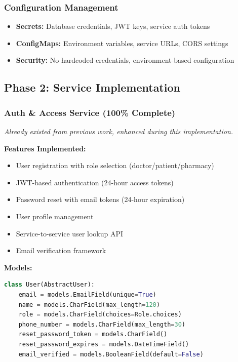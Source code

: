 \documentclass[12pt,a4paper]{article}
\begin{document}
\subsubsection{Configuration Management}
\begin{itemize}
    \item \textbf{Secrets:} Database credentials, JWT keys, service auth tokens
    \item \textbf{ConfigMaps:} Environment variables, service URLs, CORS settings
    \item \textbf{Security:} No hardcoded credentials, environment-based configuration
\end{itemize}

\subsection{Phase 2: Service Implementation}

\subsubsection{Auth \& Access Service (100\% Complete)}
\textit{Already existed from previous work, enhanced during this implementation.}

\textbf{Features Implemented:}
\begin{itemize}
    \item User registration with role selection (doctor/patient/pharmacy)
    \item JWT-based authentication (24-hour access tokens)
    \item Password reset with email tokens (24-hour expiration)
    \item User profile management
    \item Service-to-service user lookup API
    \item Email verification framework
\end{itemize}

\textbf{Models:}
\begin{lstlisting}[language=Python,caption={Auth Service User Model}]
class User(AbstractUser):
    email = models.EmailField(unique=True)
    name = models.CharField(max_length=120)
    role = models.CharField(choices=Role.choices)
    phone_number = models.CharField(max_length=30)
    reset_password_token = models.CharField()
    reset_password_expires = models.DateTimeField()
    email_verified = models.BooleanField(default=False)
\end{lstlisting}
\end{document}
